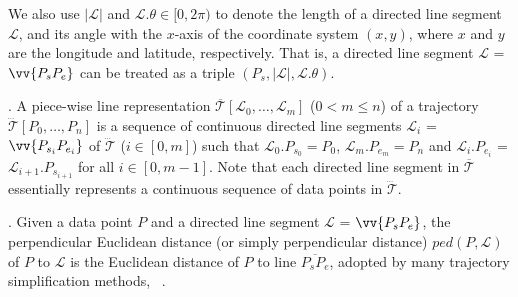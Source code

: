 We also use $|\mathcal{L}|$ and $\mathcal{L}.\theta\in [0, 2\pi)$ to denote the length of a directed line segment $\mathcal{L}$, and its angle with the $x$-axis of the coordinate system $(x, y)$, where $x$ and $y$ are the longitude and latitude, respectively.
That is, a directed line segment $\mathcal{L}$ = $\vv{P_{s}P_{e}}$ can be treated as a triple $(P_s, |\mathcal{L}|, \mathcal{L}.\theta)$.

. A piece-wise line representation $\overline{\mathcal{T}}[\mathcal{L}_0, \ldots , \mathcal{L}_m]$ ($0< m \le n$) of a trajectory $\dddot{\mathcal{T}}[P_0, \ldots, P_n]$ is a sequence of continuous directed line segments $\mathcal{L}_{i}$ = $\vv{P_{s_i}P_{e_i}}$ of $\dddot{\mathcal{T}}$ ($i\in[0,m]$)  such that $\mathcal{L}_{0}.P_{s_0} = P_0$, $\mathcal{L}_{m}.P_{e_m} = P_n$ and  $\mathcal{L}_{i}.P_{e_i}$ = $\mathcal{L}_{i+1}.P_{s_{i+1}}$ for all $i\in[0, m-1]$. Note that each directed line segment in $\overline{\mathcal{T}}$ essentially represents a continuous sequence of data points in $\dddot{\mathcal{T}}$.



. Given a data point $P$ and a directed line segment $\mathcal{L}$ = $\vv{P_{s}P_{e}}$, the perpendicular Euclidean distance (or simply perpendicular distance) $ped(P, \mathcal{L})$ of $P$ to $\mathcal{L}$  is the Euclidean distance of $P$ to line $\overline{P_{s}P_{e}}$, adopted by many trajectory simplification methods, \eg~\cite{Douglas:Peucker, Hershberger:Speeding, Liu:BQS, Williams:Longest, Sklansky:Cone, Dunham:Cone, Zhao:Sleeve, Lin:Operb}.



